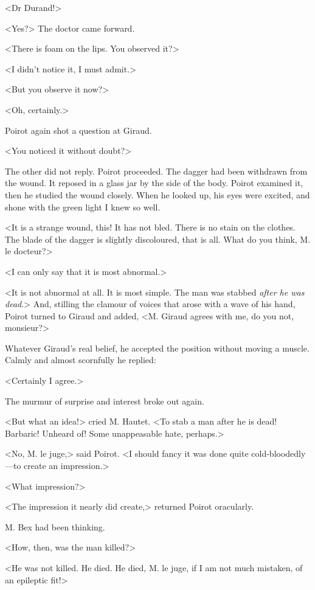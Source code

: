  <Dr Durand!> 

 <Yes?> The doctor came forward. 

 <There is foam on the lips. You observed it?> 

 <I didn't notice it, I must admit.> 

 <But you observe it now?> 

 <Oh, certainly.> 

 Poirot again shot a question at Giraud. 

 <You noticed it without doubt?> 

 The other did not reply. Poirot proceeded. The dagger had been withdrawn from the wound. It reposed in a glass jar by the side of the body. Poirot examined it, then he studied the wound closely. When he looked up, his eyes were excited, and shone with the green light I knew so well. 

 <It is a strange wound, this! It has not bled. There is no stain on the clothes. The blade of the dagger is slightly discoloured, that is all. What do you think, M. le docteur?> 

 <I can only say that it is most abnormal.> 

 <It is not abnormal at all. It is most simple. The man was stabbed \emph{after he was dead}.> And, stilling the clamour of voices that arose with a wave of his hand, Poirot turned to Giraud and added, <M. Giraud agrees with me, do you not, monsieur?> 

 Whatever Giraud's real belief, he accepted the position without moving a muscle. Calmly and almost scornfully he replied: 

 <Certainly I agree.> 

 The murmur of surprise and interest broke out again. 

 <But what an idea!> cried M. Hautet. <To stab a man after he is dead! Barbaric! Unheard of! Some unappeasable hate, perhaps.> 

 <No, M. le juge,> said Poirot. <I should fancy it was done quite cold-bloodedly—to create an impression.> 

 <What impression?> 

 <The impression it nearly did create,> returned Poirot oracularly. 

 M. Bex had been thinking. 

 <How, then, was the man killed?> 

 <He was not killed. He died. He died, M. le juge, if I am not much mistaken, of an epileptic fit!> 

